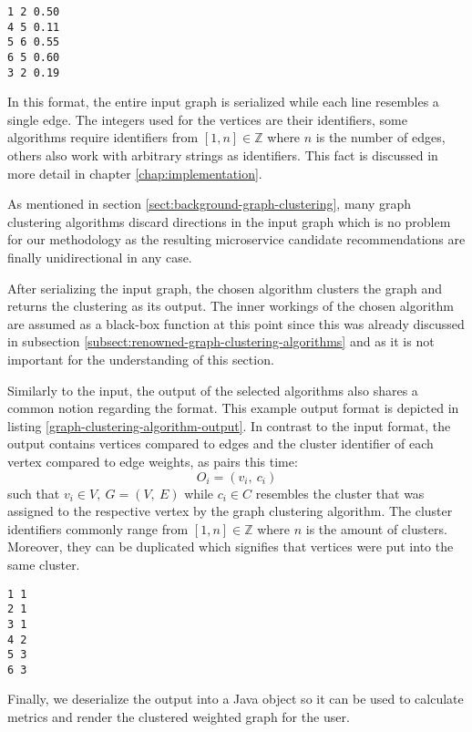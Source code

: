 \documentclass[12pt,a4paper]{report}
\begin{document}
\begin{lstlisting}[caption=Example graph clustering algorithm input, label=graph-clustering-algorithm-input, breaklines=true]
1 2 0.50
4 5 0.11
5 6 0.55
6 5 0.60
3 2 0.19
\end{lstlisting}

In this format, the entire input graph is serialized while each line resembles
a single edge. The integers used for the vertices are their identifiers,
some algorithms require identifiers from \([1, n] \in \mathbb{Z}\) where \(n\)
is the number of edges, others also work with arbitrary strings as identifiers.
This fact is discussed in more detail in chapter \ref{chap:implementation}.

As mentioned in section \ref{sect:background-graph-clustering}, many graph
clustering algorithms discard directions in the input graph which is no problem
for our methodology as the resulting microservice candidate recommendations
are finally unidirectional in any case.

After serializing the input graph, the chosen algorithm clusters the graph
and returns the clustering as its output. The inner workings of the chosen
algorithm are assumed as a black-box function at this point since this was
already discussed in subsection \ref{subsect:renowned-graph-clustering-algorithms}
and as it is not important for the understanding of this section.

Similarly to the input, the output of the selected algorithms also shares
a common notion regarding the format. This example output format is depicted
in listing \ref{graph-clustering-algorithm-output}.
In contrast to the input format, the output contains vertices compared to edges
and the cluster identifier of each vertex compared to edge weights,
as pairs this time:
\[
  O_i = (v_i, \ c_i)
\]
such that \(v_i \in V, \ G = (V, \ E)\) while \(c_i \in C\) resembles the
cluster that was assigned to the respective vertex by the graph clustering
algorithm. The cluster identifiers commonly range from \([1, n] \in \mathbb{Z}\)
where \(n\) is the amount of clusters. Moreover, they can be duplicated
which signifies that vertices were put into the same cluster.

\begin{lstlisting}[caption=Example graph clustering algorithm output, label=graph-clustering-algorithm-output, breaklines=true]
1 1
2 1
3 1
4 2
5 3
6 3
\end{lstlisting}

Finally, we deserialize the output into a Java object so it can be used to
calculate metrics and render the clustered weighted graph for the user.
\end{document}
